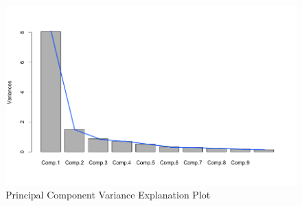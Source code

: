 \documentclass[letterpaper, 12pt]{article}
\begin{document}
	\begin{figure}[!htbp]\centering
		\caption{Principal Component Variance Explanation Plot}
		\label{fig:pc_plot}
		\includegraphics[scale=.40]{pc_out}
	\end{figure}
	
\end{document}
